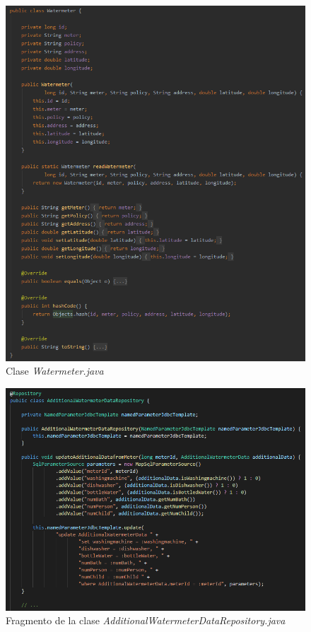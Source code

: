 \documentclass[pdftex,11pt,a4paper]{book}
\begin{document}
 \begin{figure}[H]
 \centering
 \includegraphics [scale=0.85] {images/implementacion/watermeter-model-java.png}
 \caption{Clase \textit{Watermeter.java}} \label{fig:model-watermeter-java}
 \end{figure}
 

 \begin{figure}[H]
 \centering
 \includegraphics [scale=0.72] {images/implementacion/watermeter-repository.png}
 \caption{Fragmento de la clase \textit{AdditionalWatermeterDataRepository.java}} \label{fig:watermeter-repository}
 \end{figure}
\end{document}

